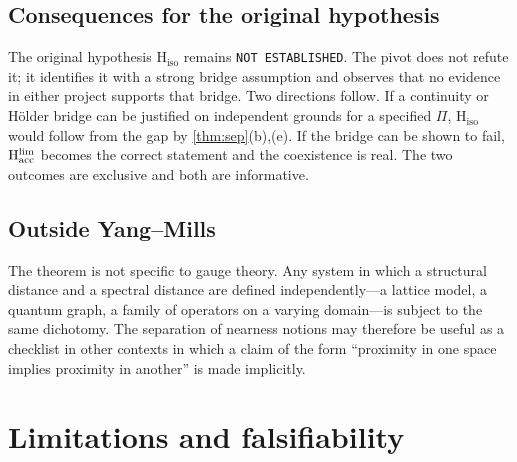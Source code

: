 \documentclass[11pt,a4paper]{article}
\theoremstyle{definition}
\theoremstyle{remark}
\newcommand{\Hacc}{\mathrm{H}_{\mathrm{acc}}}
\newcommand{\Hiso}{\mathrm{H}_{\mathrm{iso}}}
\begin{document}
\subsection{Consequences for the original hypothesis}\label{ssec:consequences}
The original hypothesis $\Hiso$ remains \texttt{NOT ESTABLISHED}. The pivot does not refute it; it identifies it with a strong bridge assumption and observes that no evidence in either project supports that bridge. Two directions follow. If a continuity or H\"older bridge can be justified on independent grounds for a specified $\Pi$, $\Hiso$ would follow from the gap by \cref{thm:sep}(b),(e). If the bridge can be shown to fail, $\Hacc^{\rm lim}$ becomes the correct statement and the coexistence is real. The two outcomes are exclusive and both are informative.

\subsection{Outside Yang--Mills}\label{ssec:outside}
The theorem is not specific to gauge theory. Any system in which a structural distance and a spectral distance are defined independently---a lattice model, a quantum graph, a family of operators on a varying domain---is subject to the same dichotomy. The separation of nearness notions may therefore be useful as a checklist in other contexts in which a claim of the form ``proximity in one space implies proximity in another'' is made implicitly.

\section{Limitations and falsifiability}\label{sec:limits}
\end{document}

